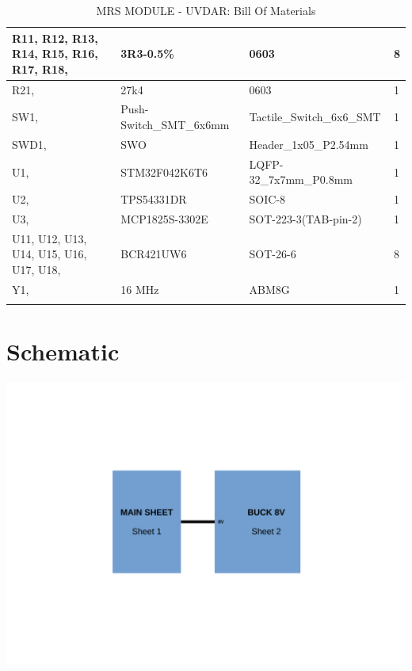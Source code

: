 \documentclass[12pt, a4paper]{article}
\begin{document}
\begin{longtable}{|p{5cm}|p{5cm}|p{5cm}|p{1.7cm}|}
R11, R12, R13, R14, R15, R16, R17, R18, & 3R3-0.5\%               & 0603                      & 8        \\ \hline
R21,                                    & 27k4                    & 0603                      & 1        \\ \hline
SW1,                                    & Push-Switch\_SMT\_6x6mm & Tactile\_Switch\_6x6\_SMT & 1        \\ \hline
SWD1,                                   & SWO                     & Header\_1x05\_P2.54mm     & 1        \\ \hline
U1,                                     & STM32F042K6T6           & LQFP-32\_7x7mm\_P0.8mm    & 1        \\ \hline
U2,                                     & TPS54331DR              & SOIC-8                    & 1        \\ \hline
U3,                                     & MCP1825S-3302E          & SOT-223-3(TAB-pin-2)      & 1        \\ \hline
U11, U12, U13, U14, U15, U16, U17, U18, & BCR421UW6               & SOT-26-6                  & 8        \\ \hline
Y1,                                     & 16 MHz                  & ABM8G          & 1        \\ \hline

\caption{MRS MODULE - UVDAR: Bill Of Materials}
\label{tab:bom}
\end{longtable}
\vfill
\restoregeometry

\pagebreak


\pagebreak


\pagebreak
\section{Schematic}
\begin{center}
\includegraphics[scale=0.75, angle=270]{figures/Schematic_Hierarchy.pdf}
\end{center}
\pagebreak

\end{document}
